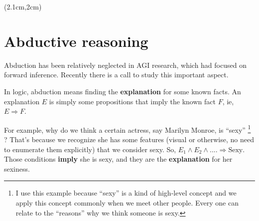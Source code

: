 \begin{preview}
\setlength{\parskip}{0.4\baselineskip}
\begin{textblock*}{20cm}(2.1cm,2cm) %
	{}
	\hspace{8cm}
	\color{blue}{\footnotesize 逻辑化 AGI 基础}
\end{textblock*}
\vspace*{0.3cm} 

\section{Abductive reasoning}
\label{sec:abductive-reasoning}

Abduction has been relatively neglected in AGI research, which had focused on forward inference.  Recently there is a call to study this important aspect.

In logic, abduction means finding the \textbf{explanation} for some known facts.  An explanation $E$ is simply some propositions that imply the known fact $F$, ie, $E \Rightarrow F$.

For example, why do we think a certain actress, say Marilyn Monroe, is ``sexy'' \footnote{I use this example because ``sexy'' is a kind of high-level concept and we apply this concept commonly when we meet other people.  Every one can relate to the ``reasons'' why we think someone is sexy.} ?  That's because we recognize she has some features (visual or otherwise, no need to enumerate them explicitly) that we consider sexy.  So, $E_1 \wedge E_2 \wedge .... \Rightarrow \mathrm{Sexy}$.  Those conditions \textbf{imply} she is sexy, and they are the \textbf{explanation} for her sexiness.


\end{preview}
